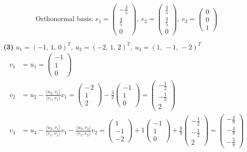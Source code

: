 \[ \text{Orthonormal basis: }e_1=\begin{pmatrix}- \frac{3}{5} \\ \frac{4}{5} \\ 0\end{pmatrix},\ e_2=\begin{pmatrix}\frac{4}{5} \\ \frac{3}{5} \\ 0\end{pmatrix},\ e_3=\begin{pmatrix}0 \\ 0 \\ 1\end{pmatrix} \]

\noindent\textbf{(3)} $u_1=(-1,\,1,\,0)^T,\ u_2=(-2,\,1,\,2)^T,\ u_3=(1,\,-1,\,-2)^T$
\begin{align*}
v_1&=u_1=\begin{pmatrix}-1 \\ 1 \\ 0\end{pmatrix} \\
v_2&=u_2-\frac{\langle u_2,v_1\rangle}{\langle v_1,v_1\rangle}v_1=\begin{pmatrix}-2 \\ 1 \\ 2\end{pmatrix}-\frac{3}{2}\begin{pmatrix}-1 \\ 1 \\ 0\end{pmatrix}=\begin{pmatrix}- \frac{1}{2} \\ - \frac{1}{2} \\ 2\end{pmatrix} \\
v_3&=u_3-\frac{\langle u_3,v_1\rangle}{\langle v_1,v_1\rangle}v_1-\frac{\langle u_3,v_2\rangle}{\langle v_2,v_2\rangle}v_2=\begin{pmatrix}1 \\ -1 \\ -2\end{pmatrix}+1\begin{pmatrix}-1 \\ 1 \\ 0\end{pmatrix} +\frac{8}{9}\begin{pmatrix}- \frac{1}{2} \\ - \frac{1}{2} \\ 2\end{pmatrix}=\begin{pmatrix}- \frac{4}{9} \\ - \frac{4}{9} \\ - \frac{2}{9}\end{pmatrix}
\end{align*}

